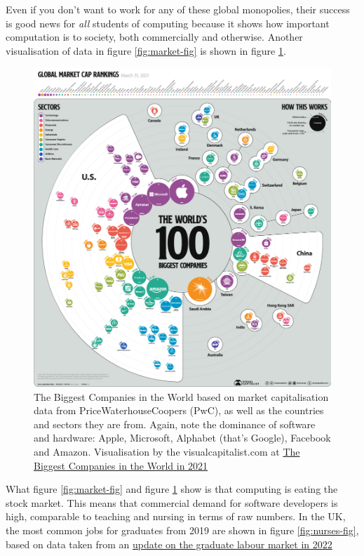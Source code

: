 \documentclass[
]{book}
\begin{document}
Even if you don't want to work for any of these global monopolies, their success is good news for \emph{all} students of computing because it shows how important computation is to society, both commercially and otherwise. Another visualisation of data in figure \ref{fig:market-fig} is shown in figure \ref{fig:market-again-fig}.

\begin{figure}

{\centering \includegraphics[width=1\linewidth]{images/Biggest-Companies-in-the-World} 

}

\caption{The Biggest Companies in the World based on market capitalisation data from PriceWaterhouseCoopers (PwC), as well as the countries and sectors they are from. Again, note the dominance of software and hardware: Apple, Microsoft, Alphabet (that's Google), Facebook and Amazon. Visualisation by the visualcapitalist.com at \href{https://www.visualcapitalist.com/the-biggest-companies-in-the-world-in-2021/}{The Biggest Companies in the World in 2021} \citep{visualcap}}\label{fig:market-again-fig}
\end{figure}



What figure \ref{fig:market-fig} and figure \ref{fig:market-again-fig} show is that computing is eating the stock market. This means that commercial demand for software developers is high, comparable to teaching and nursing in terms of raw numbers. In the UK, the most common jobs for graduates from 2019 are shown in figure \ref{fig:nurses-fig}, based on data taken from an \href{https://luminate.prospects.ac.uk/uk-graduate-labour-market-update-11-january}{update on the graduate labour market in 2022} \citep{labourmarket2022}
\end{document}
